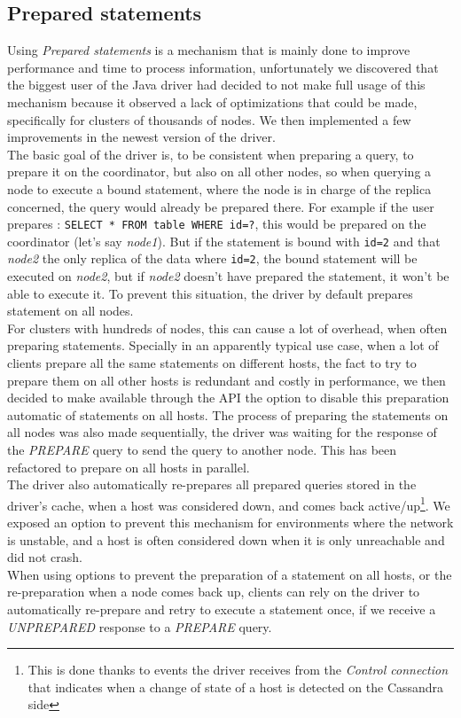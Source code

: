 \documentclass[a4paper]{report}
\begin{document}
\subsection{Prepared statements}
Using \emph{Prepared statements} is a mechanism that is mainly done to improve performance and time to process information, unfortunately we discovered that the biggest user of the Java driver had decided to not make full usage of this mechanism because it observed a lack of optimizations that could be made, specifically for clusters of thousands of nodes. We then implemented a few improvements in the newest version of the driver.\\
The basic goal of the driver is, to be consistent when preparing a query, to prepare it on the coordinator, but also on all other nodes, so when querying a node to execute a bound statement, where the node is in charge of the replica concerned, the query would already be prepared there. For example if the user prepares : \verb;SELECT * FROM table WHERE id=?;, this would be prepared on the coordinator (let's say \emph{node1}). But if the statement is bound with \verb;id=2; and that \emph{node2} the only replica of the data where \verb;id=2;, the bound statement will be executed on \emph{node2}, but if \emph{node2} doesn't have prepared the statement, it won't be able to execute it. To prevent this situation, the driver by default prepares statement on all nodes.\\
For clusters with hundreds of nodes, this can cause a lot of overhead, when often preparing statements. Specially in an apparently typical use case, when a lot of clients prepare all the same statements on different hosts, the fact to try to prepare them on all other hosts is redundant and costly in performance, we then decided to make available through the API the option to disable this preparation automatic of statements on all hosts. The process of preparing the statements on all nodes was also made sequentially, the driver was waiting for the response of the \emph{PREPARE} query to send the query to another node. This has been refactored to prepare on all hosts in parallel.\\
The driver also automatically re-prepares all prepared queries stored in the driver's cache, when a host was considered down, and comes back active/up\footnote{This is done thanks to events the driver receives from the \emph{Control connection} that indicates when a change of state of a host is detected on the Cassandra side}. We exposed an option to prevent this mechanism for environments where the network is unstable, and a host is often considered down when it is only unreachable and did not crash.\\
When using options to prevent the preparation of a statement on all hosts, or the re-preparation when a node comes back up, clients can rely on the driver to automatically re-prepare and retry to execute a statement once, if we receive a \emph{UNPREPARED} response to a \emph{PREPARE} query.
\end{document}

